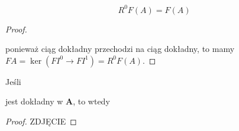 \begin{uwaga}
  $$R^0F(A)=F(A)$$
\end{uwaga}

\begin{proof}
  \begin{center}\end{center}
  ponieważ ciąg dokładny przechodzi na ciąg dokładny, to mamy $FA=\ker (FI^0\to FI^1)=R^0F(A)$.
\end{proof}

\begin{fact}
  Jeśli
  \begin{center}\end{center}
  jest dokładny w $\mathbf{A}$, to wtedy
  \begin{center}\end{center}
\end{fact}

\begin{proof}
  {\large\color{red}ZDJĘCIE}
\end{proof}
